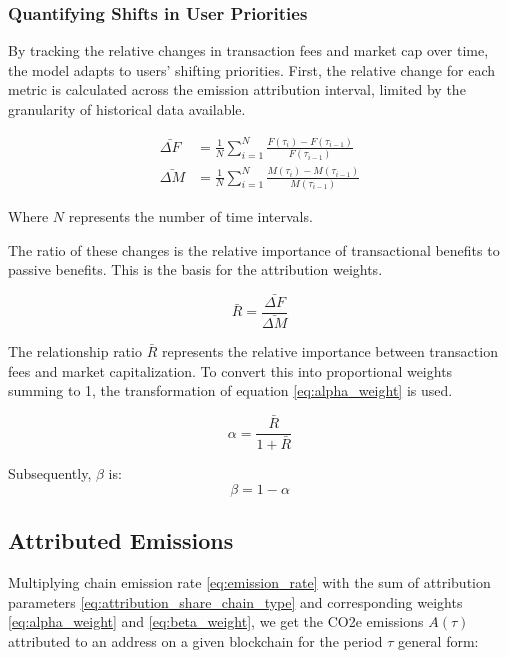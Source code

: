 \documentclass[11pt]{report}
\begin{document}
\subsubsection{Quantifying Shifts in User Priorities}

By tracking the relative changes in transaction fees and market cap over time, the model adapts to users' shifting priorities. First, the relative change for each metric is calculated across the emission attribution interval, limited by the granularity of historical data available.

\begin{align}
    \bar{\Delta F} & = \frac{1}{N}\sum_{i=1}^{N}\frac{F(\tau_i) - F(\tau_{i-1})}{F(\tau_{i-1})} \\
    \bar{\Delta M} & = \frac{1}{N}\sum_{i=1}^{N}\frac{M(\tau_i) - M(\tau_{i-1})}{M(\tau_{i-1})}
\end{align}



Where \( N \) represents the number of time intervals.

The ratio of these changes is the relative importance of transactional benefits to passive benefits. This is the basis for the attribution weights.

\begin{equation} \label{eq:weights_ratio}
    \bar{R} = \frac{\bar{\Delta F}}{\bar{\Delta M}}
\end{equation}

The relationship ratio $\bar{R}$ represents the relative importance between transaction fees and market capitalization. To convert this into proportional weights summing to 1, the transformation of equation \eqref{eq:alpha_weight} is used.

\begin{equation} \label{eq:alpha_weight}
    \alpha = \frac{\bar{R}}{1 + \bar{R}}
\end{equation}

Subsequently, \( \beta \) is:
\begin{equation} \label{eq:beta_weight}
    \beta = 1 - \alpha
\end{equation}


\subsection{Attributed Emissions}

Multiplying chain emission rate \eqref{eq:emission_rate} with the sum of attribution parameters \eqref{eq:attribution_share_chain_type} and corresponding weights \eqref{eq:alpha_weight} and \eqref{eq:beta_weight}, we get the CO2e emissions \(A(\tau)\) attributed to an address on a given blockchain for the period $\tau$ general form:
\end{document}
